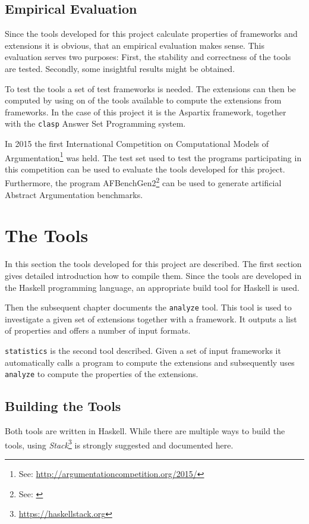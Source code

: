\documentclass[parskip=half]{scrartcl}
\begin{document}
\subsection{Empirical Evaluation}
Since the tools developed for this project calculate properties of frameworks
and extensions it is obvious, that an empirical evaluation makes sense. This
evaluation serves two purposes: First, the stability and correctness of the
tools are tested. Secondly, some insightful results might be obtained.

To test the tools a set of test frameworks is needed. The extensions can then be
computed by using on of the tools available to compute the extensions from
frameworks. In the case of this project it is the Aspartix framework, together
with the \texttt{clasp} Answer Set Programming system.

In 2015 the first International Competition on Computational Models of
Argumentation\footnote{See: \url{http://argumentationcompetition.org/2015/}}
was held. The test set used to test the programs participating in this
competition can be used to evaluate the tools developed for this project.
Furthermore, the program AFBenchGen2\footnote{See: \cite{afbenchgen2}}
can be used to generate artificial Abstract Argumentation benchmarks.

\section{The Tools}
\label{tools}
In this section the tools developed for this project are described. The first
section gives detailed introduction how to compile them. Since the tools are
developed in the Haskell programming language, an  appropriate build tool for
Haskell is used.

Then the subsequent chapter documents the \texttt{analyze} tool. This tool is
used to investigate a given set of extensions together with a framework. It
outputs a list of properties and offers a number of input formats.

\texttt{statistics} is the second tool described. Given a set of input
frameworks it automatically calls a program to compute the extensions and
subsequently uses \texttt{analyze} to compute the properties of the extensions.

\subsection{Building the Tools}
Both tools are written in Haskell. While there are multiple ways to build the
tools, using \emph{Stack}\footnote{\url{https://haskellstack.org}} is strongly
suggested and documented here.
\end{document}
